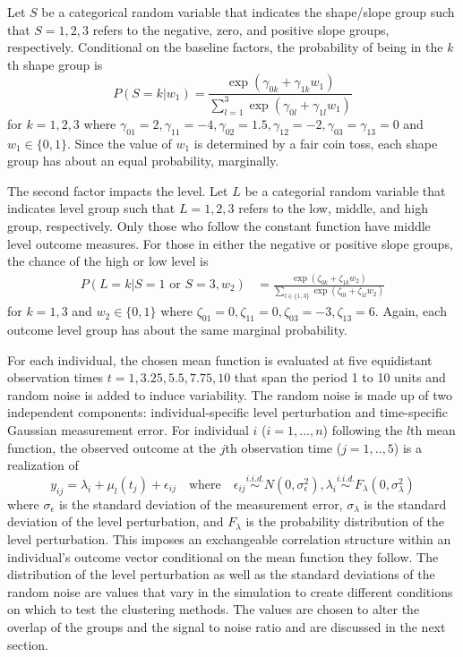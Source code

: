 Let $S$ be a categorical random variable that indicates the shape/slope group such that $S=1,2,3$ refers to the negative, zero, and positive slope groups, respectively. Conditional on the baseline factors, the probability of being in the $k$th shape group is
$$P(S=k |w_{1}) = \frac{\exp(\gamma_{0k}+\gamma_{1k}w_{1})}{\sum^{3}_{l=1} \exp(\gamma_{0l}+\gamma_{1l}w_{1})}$$
for $k=1,2,3$ where $\gamma_{01}=2,\gamma_{11} = -4,\gamma_{02}=1.5,\gamma_{12}=-2,\gamma_{03}=\gamma_{13} = 0$ and $w_{1}\in\{0,1\}$. Since the value of $w_{1}$ is determined by a fair coin toss, each shape group has about an equal probability, marginally. 

The second factor impacts the level. Let $L$ be a categorial random variable that indicates level group such that $L=1,2,3$ refers to the low, middle, and high group, respectively. Only those who follow the constant function have middle level outcome measures. For those in either the negative or positive slope groups, the chance of the high or low level is
\begin{align*}
P(L=k|S=1 \text{ or } S=3,w_{2}) & = \frac{\exp(\zeta_{0k}+\zeta_{1k} w_{2})}{\sum_{l\in\{1,3\} }\exp(\zeta_{0l}+\zeta_{1l}w_{2})}
\end{align*}
for $k=1,3$ and $w_{2}\in\{0,1\}$ where $\zeta_{01}=0,\zeta_{11}=0,\zeta_{03}=-3,\zeta_{13}=6$. Again, each outcome level group has about the same marginal probability.

For each individual, the chosen mean function is evaluated at five equidistant observation times $t=1,3.25,5.5,7.75,10$ that span the period 1 to 10 units and random noise is added to induce variability. The random noise is made up of two independent components: individual-specific level perturbation and time-specific Gaussian measurement error. For individual $i$ ($i=1,...,n$)  following the $l$th mean function, the observed outcome at the $j$th observation time ($j=1,..,5$) is a realization of
$$y_{ij} = \lambda_{i}+\mu_{l}(t_{j})+\epsilon_{ij}\quad\text{where}\quad \epsilon_{ij}\stackrel{i.i.d.}{\sim} N(0,\sigma_{\epsilon}^{2}), \lambda_{i}\stackrel{i.i.d.}{\sim} F_{\lambda}(0,\sigma_{\lambda}^{2})$$
where $\sigma_{\epsilon}$  is the standard deviation of the measurement error, $\sigma_{\lambda}$ is the standard deviation of the level perturbation, and $F_{\lambda}$ is the probability distribution of the level perturbation. This imposes an exchangeable correlation structure within an individual's outcome vector conditional on the mean function they follow. The distribution of the level perturbation as well as the standard deviations of the random noise are values that vary in the simulation to create different conditions on which to test the clustering methods. The values are chosen to alter the overlap of the groups and the signal to noise ratio and are discussed in the next section.

